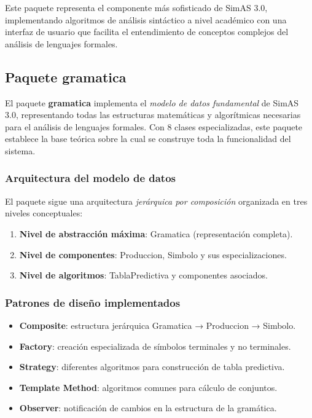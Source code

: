 Este paquete representa el componente más sofisticado de SimAS 3.0, implementando algoritmos de análisis sintáctico a nivel académico con una interfaz de usuario que facilita el entendimiento de conceptos complejos del análisis de lenguajes formales.

\subsection{Paquete gramatica}

El paquete \textbf{gramatica} implementa el \textit{modelo de datos fundamental} de SimAS 3.0, representando todas las estructuras matemáticas y algorítmicas necesarias para el análisis de lenguajes formales. Con 8 clases especializadas, este paquete establece la base teórica sobre la cual se construye toda la funcionalidad del sistema.

\subsubsection{Arquitectura del modelo de datos}

El paquete sigue una arquitectura \textit{jerárquica por composición} organizada en tres niveles conceptuales:

\begin{enumerate}
    \item \textbf{Nivel de abstracción máxima}: Gramatica (representación completa).
    \item \textbf{Nivel de componentes}: Produccion, Simbolo y sus especializaciones.
    \item \textbf{Nivel de algoritmos}: TablaPredictiva y componentes asociados.
\end{enumerate}

\subsubsection{Patrones de diseño implementados}

\begin{itemize}
    \item \textbf{Composite}: estructura jerárquica Gramatica → Produccion → Simbolo.
    \item \textbf{Factory}: creación especializada de símbolos terminales y no terminales.
    \item \textbf{Strategy}: diferentes algoritmos para construcción de tabla predictiva.
    \item \textbf{Template Method}: algoritmos comunes para cálculo de conjuntos.
    \item \textbf{Observer}: notificación de cambios en la estructura de la gramática.
\end{itemize}

